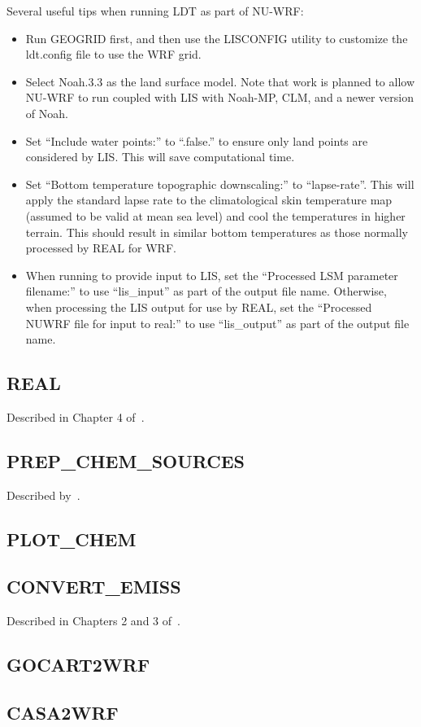 Several useful tips when running LDT as part of NU-WRF:
\begin{itemize}
\item Run GEOGRID first, and then use the LISCONFIG utility to customize the
ldt.config file to use the WRF grid. 
\item Select Noah.3.3 as the land surface model. Note that work is planned to 
allow NU-WRF to run coupled with LIS with Noah-MP, CLM, and a newer version of
Noah.
\item Set ``Include water points:'' to ``.false.'' to ensure only land points
are considered by LIS. This will save computational time.
\item Set ``Bottom temperature topographic downscaling:'' to ``lapse-rate''.
This will apply the standard lapse rate to the climatological skin temperature
map (assumed to be valid at mean sea level) and cool the temperatures in
higher terrain. This should result in similar bottom temperatures as those
normally processed by REAL for WRF.
\item When running to provide input to LIS, set the 
``Processed LSM parameter filename:'' to use ``lis\_input'' as part of the 
output file name. Otherwise, when processing the LIS output for use by REAL,
set the ``Processed NUWRF file for input to real:'' to use ``lis\_output'' as
part of the output file name. 
\end{itemize}


\subsection{REAL}

Described in Chapter 4 of~\cite{ref:ArwUserGuide}.

\subsection{PREP\_CHEM\_SOURCES}

Described by~\cite{ref:FreitasEtAl2011}.

\subsection{PLOT\_CHEM}
\subsection{CONVERT\_EMISS}

Described in Chapters 2 and 3 of~\cite{ref:WrfChemUserGuide}.

\subsection{GOCART2WRF}

\subsection{CASA2WRF}


